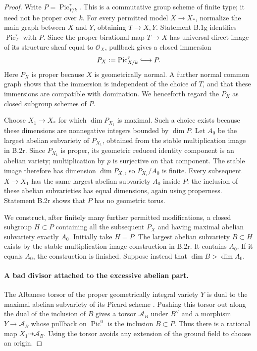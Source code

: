 \begin{proof}
Write $P=\operatorname{Pic}^{\tau}_{Y/k}$.  This is a commutative
group scheme of finite type; it need not be proper over $k$.
For every permitted model $X\to X_*$, normalize the main graph
between $X$ and $Y$, obtaining $T\to X,Y$.  Statement B.1g
identifies $\operatorname{Pic}^{\tau}_T$ with $P$.
Since the proper birational map $T\to X$ has universal direct
image of its structure sheaf equal to $\mathcal O_X$, pullback
gives a closed immersion
\[
                       P_X:=\operatorname{Pic}^{\tau}_{X/k}
                              \lhook\joinrel\longrightarrow P.
\]
Here $P_X$ is proper because $X$ is geometrically normal.
A further normal common graph shows that the immersion is
independent of the choice of $T$, and that these immersions are
compatible with domination.  We henceforth regard the $P_X$ as
closed subgroup schemes of $P$.

Choose $X_1\to X_*$ for which $\dim P_{X_1}$ is maximal.
Such a choice exists because these dimensions are nonnegative
integers bounded by $\dim P$.  Let $A_0$ be the largest abelian
subvariety of $P_{X_1}$, obtained from the stable multiplication
image in B.2r.  Since $P_{X_1}$ is proper, its geometric reduced
identity component is an abelian variety; multiplication by $p$
is surjective on that component.  The stable image therefore
has dimension $\dim P_{X_1}$, so $P_{X_1}/A_0$ is finite.
Every subsequent $X\to X_1$ has the same largest abelian
subvariety $A_0$ inside $P$: the inclusion of these abelian
subvarieties has equal dimensions, again using properness.
Statement B.2r shows that $P$ has no geometric torus.

We construct, after finitely many further permitted modifications,
a closed subgroup $H\subset P$ containing all the subsequent
$P_X$ and having maximal abelian subvariety exactly $A_0$.
Initially take $H=P$.  The largest abelian subvariety $B\subset H$
exists by the stable-multiplication-image construction in B.2r.
It contains $A_0$.  If it equals $A_0$, the construction is finished.
Suppose instead that $\dim B>\dim A_0$.

\paragraph{A bad divisor attached to the excessive abelian part.}
The Albanese torsor of the proper geometrically integral variety
$Y$ is dual to the maximal abelian subvariety of its Picard
scheme \cite[Theorem 3.2 and Remark 3.3, pp.~12--13 of the
author manuscript]{C_ACMV2026}.  Pushing this torsor out along
the dual of the inclusion of $B$ gives a torsor $\mathcal A_B$
under $B^\vee$ and a morphism $Y\to\mathcal A_B$ whose pullback
on $\operatorname{Pic}^0$ is the inclusion $B\subset P$.
Thus there is a rational map $X_1\dashrightarrow\mathcal A_B$.
Using the torsor avoids any extension of the ground field to
choose an origin.


\end{proof}
